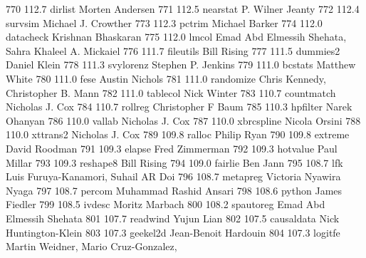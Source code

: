    770    112.7    dirlist       Morten Andersen                         
   771    112.5    nearstat      P. Wilner Jeanty                        
   772    112.4    survsim       Michael J. Crowther                     
   773    112.3    pctrim        Michael Barker                          
   774    112.0    datacheck     Krishnan Bhaskaran                      
   775    112.0    lmcol         Emad Abd Elmessih Shehata, Sahra        
                                   Khaleel A. Mickaiel                     
   776    111.7    fileutils     Bill Rising                             
   777    111.5    dummies2      Daniel Klein                            
   778    111.3    svylorenz     Stephen P. Jenkins                      
   779    111.0    bcstats       Matthew White                           
   780    111.0    fese          Austin Nichols                          
   781    111.0    randomize     Chris Kennedy, Christopher B. Mann      
   782    111.0    tablecol      Nick Winter                             
   783    110.7    countmatch    Nicholas J. Cox                         
   784    110.7    rollreg       Christopher F Baum                      
   785    110.3    hpfilter      Narek Ohanyan                           
   786    110.0    vallab        Nicholas J. Cox                         
   787    110.0    xbrcspline    Nicola Orsini                           
   788    110.0    xttrans2      Nicholas J. Cox                         
   789    109.8    ralloc        Philip Ryan                             
   790    109.8    extreme       David Roodman                           
   791    109.3    elapse        Fred Zimmerman                          
   792    109.3    hotvalue      Paul Millar                             
   793    109.3    reshape8      Bill Rising                             
   794    109.0    fairlie       Ben Jann                                
   795    108.7    lfk           Luis Furuya-Kanamori, Suhail AR Doi     
   796    108.7    metapreg      Victoria Nyawira Nyaga                  
   797    108.7    percom        Muhammad Rashid Ansari                  
   798    108.6    python        James Fiedler                           
   799    108.5    ivdesc        Moritz Marbach                          
   800    108.2    spautoreg     Emad Abd Elmessih Shehata               
   801    107.7    readwind      Yujun Lian                              
   802    107.5    causaldata    Nick Huntington-Klein                   
   803    107.3    geekel2d      Jean-Benoit Hardouin                    
   804    107.3    logitfe       Martin Weidner, Mario Cruz-Gonzalez,    
